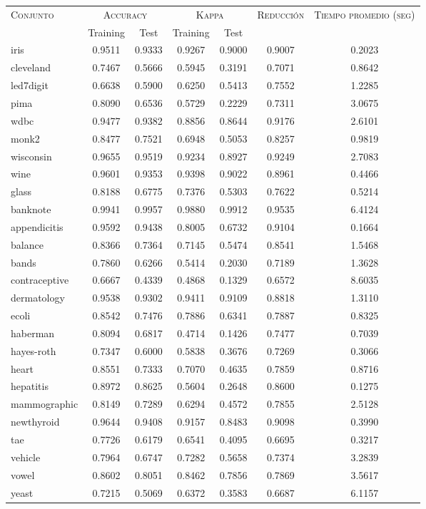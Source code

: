 \begin{table}[]
\centering
\begin{tabular}{l c c c c c c}
\hline
\multirow{2}{*}{\textsc{Conjunto}}
	& \multicolumn{2}{c}{\textsc{Accuracy}}
	& \multicolumn{2}{c}{\textsc{Kappa}}
	& \textsc{Reducción}
	& \textsc{Tiempo promedio (seg)} \\
	& Training & Test
	& Training & Test \\ 
\hline
\hline

iris & 0.9511 & 0.9333 & 0.9267 & 0.9000 & 0.9007 & 0.2023 \\
cleveland & 0.7467 & 0.5666 & 0.5945 & 0.3191 & 0.7071 & 0.8642 \\
led7digit & 0.6638 & 0.5900 & 0.6250 & 0.5413 & 0.7552 & 1.2285 \\
pima & 0.8090 & 0.6536 & 0.5729 & 0.2229 & 0.7311 & 3.0675 \\
wdbc & 0.9477 & 0.9382 & 0.8856 & 0.8644 & 0.9176 & 2.6101 \\
monk2 & 0.8477 & 0.7521 & 0.6948 & 0.5053 & 0.8257 & 0.9819 \\
wisconsin & 0.9655 & 0.9519 & 0.9234 & 0.8927 & 0.9249 & 2.7083 \\
wine & 0.9601 & 0.9353 & 0.9398 & 0.9022 & 0.8961 & 0.4466 \\
glass & 0.8188 & 0.6775 & 0.7376 & 0.5303 & 0.7622 & 0.5214 \\
banknote & 0.9941 & 0.9957 & 0.9880 & 0.9912 & 0.9535 & 6.4124 \\
appendicitis & 0.9592 & 0.9438 & 0.8005 & 0.6732 & 0.9104 & 0.1664 \\
balance & 0.8366 & 0.7364 & 0.7145 & 0.5474 & 0.8541 & 1.5468 \\
bands & 0.7860 & 0.6266 & 0.5414 & 0.2030 & 0.7189 & 1.3628 \\
contraceptive & 0.6667 & 0.4339 & 0.4868 & 0.1329 & 0.6572 & 8.6035 \\
dermatology & 0.9538 & 0.9302 & 0.9411 & 0.9109 & 0.8818 & 1.3110 \\
ecoli & 0.8542 & 0.7476 & 0.7886 & 0.6341 & 0.7887 & 0.8325 \\
haberman & 0.8094 & 0.6817 & 0.4714 & 0.1426 & 0.7477 & 0.7039 \\
hayes-roth & 0.7347 & 0.6000 & 0.5838 & 0.3676 & 0.7269 & 0.3066 \\
heart & 0.8551 & 0.7333 & 0.7070 & 0.4635 & 0.7859 & 0.8716 \\
hepatitis & 0.8972 & 0.8625 & 0.5604 & 0.2648 & 0.8600 & 0.1275 \\
mammographic & 0.8149 & 0.7289 & 0.6294 & 0.4572 & 0.7855 & 2.5128 \\
newthyroid & 0.9644 & 0.9408 & 0.9157 & 0.8483 & 0.9098 & 0.3990 \\
tae & 0.7726 & 0.6179 & 0.6541 & 0.4095 & 0.6695 & 0.3217 \\
vehicle & 0.7964 & 0.6747 & 0.7282 & 0.5658 & 0.7374 & 3.2839 \\
vowel & 0.8602 & 0.8051 & 0.8462 & 0.7856 & 0.7869 & 3.5617 \\
yeast & 0.7215 & 0.5069 & 0.6372 & 0.3583 & 0.6687 & 6.1157 \\


\end{tabular}
\end{table}
